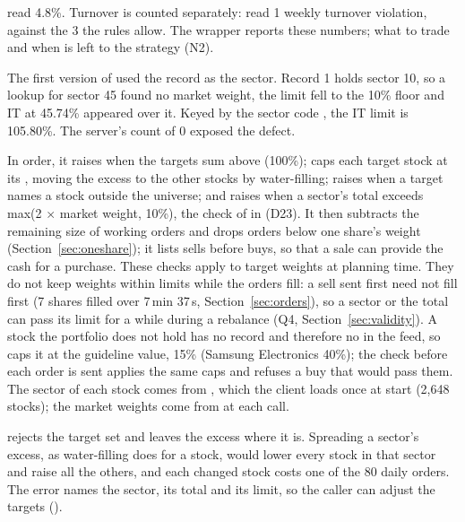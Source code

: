 

  read 4.8\%. Turnover is counted separately:  read 1 weekly turnover violation, against the 3 the rules allow. The wrapper reports these numbers; what to trade and when is left to the strategy (N2).

 The first version of  used the record  as the sector. Record  1 holds sector 10, so a lookup for sector 45 found no market weight, the limit fell to the 10\% floor and IT at 45.74\% appeared over it. Keyed by the sector code , the IT limit is 105.80\%. The server's count of 0 exposed the defect.

 In order, it raises  when the targets sum above  (100\%); caps each target stock at its , moving the excess to the other stocks by water-filling; raises when a target names a stock outside the universe; and raises when a sector's total exceeds max(2 $\times$ market weight, 10\%), the check of  in  (D23). It then subtracts the remaining size of working orders and drops orders below one share's weight (Section~\ref{sec:oneshare}); it lists sells before buys, so that a sale can provide the cash for a purchase. These checks apply to target weights at planning time. They do not keep weights within limits while the orders fill: a sell sent first need not fill first (7 shares filled over 7\,min 37\,s, Section~\ref{sec:orders}), so a sector or the total can pass its limit for a while during a rebalance (Q4, Section~\ref{sec:validity}). A stock the portfolio does not hold has no  record and therefore no  in the feed, so  caps it at the guideline value, 15\% (Samsung Electronics 40\%); the check before each order is sent applies the same caps and refuses a buy that would pass them. The sector of each stock comes from , which the client loads once at start (2,648 stocks); the market weights come from  at each call.

  rejects the target set and leaves the excess where it is. Spreading a sector's excess, as water-filling does for a stock, would lower every stock in that sector and raise all the others, and each changed stock costs one of the 80 daily orders. The error names the sector, its total and its limit, so the caller can adjust the targets ().

